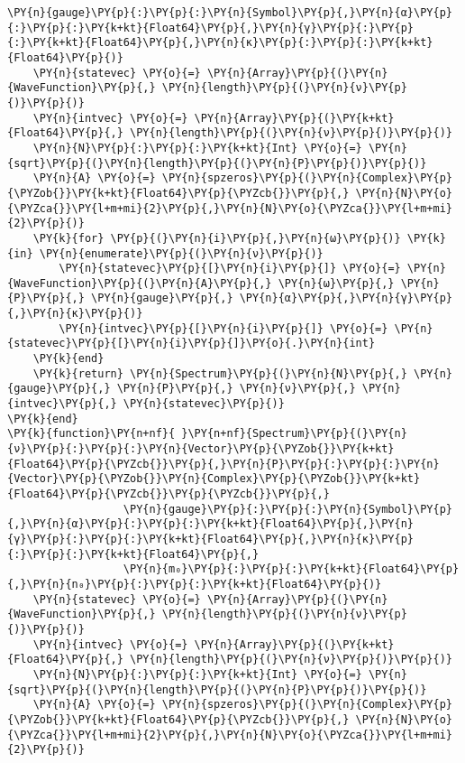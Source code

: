 \begin{Verbatim}[commandchars=\\\{\}]
                  \PY{n}{gauge}\PY{p}{:}\PY{p}{:}\PY{n}{Symbol}\PY{p}{,}\PY{n}{α}\PY{p}{:}\PY{p}{:}\PY{k+kt}{Float64}\PY{p}{,}\PY{n}{γ}\PY{p}{:}\PY{p}{:}\PY{k+kt}{Float64}\PY{p}{,}\PY{n}{κ}\PY{p}{:}\PY{p}{:}\PY{k+kt}{Float64}\PY{p}{)}
    \PY{n}{statevec} \PY{o}{=} \PY{n}{Array}\PY{p}{(}\PY{n}{WaveFunction}\PY{p}{,} \PY{n}{length}\PY{p}{(}\PY{n}{ν}\PY{p}{)}\PY{p}{)}
    \PY{n}{intvec} \PY{o}{=} \PY{n}{Array}\PY{p}{(}\PY{k+kt}{Float64}\PY{p}{,} \PY{n}{length}\PY{p}{(}\PY{n}{ν}\PY{p}{)}\PY{p}{)}
    \PY{n}{N}\PY{p}{:}\PY{p}{:}\PY{k+kt}{Int} \PY{o}{=} \PY{n}{sqrt}\PY{p}{(}\PY{n}{length}\PY{p}{(}\PY{n}{P}\PY{p}{)}\PY{p}{)}
    \PY{n}{A} \PY{o}{=} \PY{n}{spzeros}\PY{p}{(}\PY{n}{Complex}\PY{p}{\PYZob{}}\PY{k+kt}{Float64}\PY{p}{\PYZcb{}}\PY{p}{,} \PY{n}{N}\PY{o}{\PYZca{}}\PY{l+m+mi}{2}\PY{p}{,}\PY{n}{N}\PY{o}{\PYZca{}}\PY{l+m+mi}{2}\PY{p}{)}
    \PY{k}{for} \PY{p}{(}\PY{n}{i}\PY{p}{,}\PY{n}{ω}\PY{p}{)} \PY{k}{in} \PY{n}{enumerate}\PY{p}{(}\PY{n}{ν}\PY{p}{)}
        \PY{n}{statevec}\PY{p}{[}\PY{n}{i}\PY{p}{]} \PY{o}{=} \PY{n}{WaveFunction}\PY{p}{(}\PY{n}{A}\PY{p}{,} \PY{n}{ω}\PY{p}{,} \PY{n}{P}\PY{p}{,} \PY{n}{gauge}\PY{p}{,} \PY{n}{α}\PY{p}{,}\PY{n}{γ}\PY{p}{,}\PY{n}{κ}\PY{p}{)}
        \PY{n}{intvec}\PY{p}{[}\PY{n}{i}\PY{p}{]} \PY{o}{=} \PY{n}{statevec}\PY{p}{[}\PY{n}{i}\PY{p}{]}\PY{o}{.}\PY{n}{int}
    \PY{k}{end}
    \PY{k}{return} \PY{n}{Spectrum}\PY{p}{(}\PY{n}{N}\PY{p}{,} \PY{n}{gauge}\PY{p}{,} \PY{n}{P}\PY{p}{,} \PY{n}{ν}\PY{p}{,} \PY{n}{intvec}\PY{p}{,} \PY{n}{statevec}\PY{p}{)}
\PY{k}{end}
\PY{k}{function}\PY{n+nf}{ }\PY{n+nf}{Spectrum}\PY{p}{(}\PY{n}{ν}\PY{p}{:}\PY{p}{:}\PY{n}{Vector}\PY{p}{\PYZob{}}\PY{k+kt}{Float64}\PY{p}{\PYZcb{}}\PY{p}{,}\PY{n}{P}\PY{p}{:}\PY{p}{:}\PY{n}{Vector}\PY{p}{\PYZob{}}\PY{n}{Complex}\PY{p}{\PYZob{}}\PY{k+kt}{Float64}\PY{p}{\PYZcb{}}\PY{p}{\PYZcb{}}\PY{p}{,}
                  \PY{n}{gauge}\PY{p}{:}\PY{p}{:}\PY{n}{Symbol}\PY{p}{,}\PY{n}{α}\PY{p}{:}\PY{p}{:}\PY{k+kt}{Float64}\PY{p}{,}\PY{n}{γ}\PY{p}{:}\PY{p}{:}\PY{k+kt}{Float64}\PY{p}{,}\PY{n}{κ}\PY{p}{:}\PY{p}{:}\PY{k+kt}{Float64}\PY{p}{,}
                  \PY{n}{m₀}\PY{p}{:}\PY{p}{:}\PY{k+kt}{Float64}\PY{p}{,}\PY{n}{n₀}\PY{p}{:}\PY{p}{:}\PY{k+kt}{Float64}\PY{p}{)}
    \PY{n}{statevec} \PY{o}{=} \PY{n}{Array}\PY{p}{(}\PY{n}{WaveFunction}\PY{p}{,} \PY{n}{length}\PY{p}{(}\PY{n}{ν}\PY{p}{)}\PY{p}{)}
    \PY{n}{intvec} \PY{o}{=} \PY{n}{Array}\PY{p}{(}\PY{k+kt}{Float64}\PY{p}{,} \PY{n}{length}\PY{p}{(}\PY{n}{ν}\PY{p}{)}\PY{p}{)}
    \PY{n}{N}\PY{p}{:}\PY{p}{:}\PY{k+kt}{Int} \PY{o}{=} \PY{n}{sqrt}\PY{p}{(}\PY{n}{length}\PY{p}{(}\PY{n}{P}\PY{p}{)}\PY{p}{)}
    \PY{n}{A} \PY{o}{=} \PY{n}{spzeros}\PY{p}{(}\PY{n}{Complex}\PY{p}{\PYZob{}}\PY{k+kt}{Float64}\PY{p}{\PYZcb{}}\PY{p}{,} \PY{n}{N}\PY{o}{\PYZca{}}\PY{l+m+mi}{2}\PY{p}{,}\PY{n}{N}\PY{o}{\PYZca{}}\PY{l+m+mi}{2}\PY{p}{)}

\end{Verbatim}
